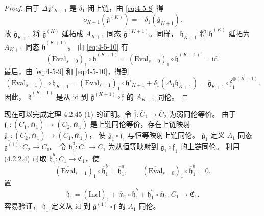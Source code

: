 \begin{proof}
由于 $\Delta\overline{\mathfrak g}'_{K+1}$ 是
$\delta_1$-闭上链，由 \eqref{eq:4-5-8} 得
\[
 o_{K+1}(\overline{\mathfrak g}^{(K)})
 =-\delta_1(\overline{\mathfrak g}_{K+1}).
\]
故 $\overline{\mathfrak g}_{K+1}$ 将
$\overline{\mathfrak g}^{(K)}$ 延拓成
$A_{K+1}$ 同态
$\overline{\mathfrak g}^{(K+1)}$。同样，
$\overline{\mathfrak h}_{K+1}$ 将
$\overline{\mathfrak h}^{(K)}$ 延拓为
$A_{K+1}$ 同态
$\overline{\mathfrak h}^{(K+1)}$。
由 \eqref{eq:4-5-10} 有
\[
 (\overline{\mathrm{Eval}}_{s=0})_1
 \circ\overline{\mathfrak h}^{(K+1)}
 =(\overline{\mathrm{Eval}}_{s=0})_1
 \circ\overline{\mathfrak h}^{(K+1)\prime}
 =\mathrm{id}.
\]
最后，由 \eqref{eq:4-5-9} 和
\eqref{eq:4-5-10}，得到
\[
 (\overline{\mathrm{Eval}}_{s=1})_1
 \circ\overline{\mathfrak h}_{K+1}
 =(\overline{\mathrm{Eval}}_{s=1})_1
  \circ\overline{\mathfrak h}'_{K+1}
  +\delta_1(\Delta_1\overline{\mathfrak h}_{K+1})
 =\overline{\mathfrak g}_{K+1}
  \circ\overline{\mathfrak f}_1^{\otimes(K+1)}.
\]
因此，
$\overline{\mathfrak h}^{(K+1)}$
是从 $\mathrm{id}$ 到
$\overline{\mathfrak g}^{(K+1)}
\circ\overline{\mathfrak f}$ 的
$A_{K+1}$ 同伦。
\end{proof}

现在可以完成定理 4.2.45 (1) 的证明。令
$\overline{\mathfrak f}\colon\overline C_1
\to\overline C_2$ 为弱同伦等价。
由于
$\overline{\mathfrak f}_1\colon
(\overline C_1,\overline{\mathfrak m}_1)
\to(\overline C_2,\overline{\mathfrak m}_1)$
是上链同伦等价，存在上链映射
$\overline{\mathfrak g}_1\colon
(\overline C_2,\overline{\mathfrak m}_1)
\to(\overline C_1,\overline{\mathfrak m}_1)$，
使
$\overline{\mathfrak g}_1
\circ\overline{\mathfrak f}_1$
与恒等映射上链同伦。
$\overline{\mathfrak g}_1$
定义 $A_1$ 同态
$\overline{\mathfrak g}^{(1)}\colon
\overline C_2\to\overline C_1$。
令 $\overline{\mathfrak h}^{a}_1\colon
\overline C_1\to\overline C_1$
为从恒等映射到
$\overline{\mathfrak g}_1\circ
\overline{\mathfrak f}_1$
的上链同伦。
利用 (4.2.2.4) 可取
$\overline{\mathfrak h}^{b}_1\colon
\overline C_1\to\overline{\mathfrak C}_1$，使
\[
 (\overline{\mathrm{Eval}}_{s=1})_1
  \circ\overline{\mathfrak h}^{b}_1
  =\overline{\mathfrak h}^{a}_1,
 \qquad
 (\overline{\mathrm{Eval}}_{s=0})_1
  \circ\overline{\mathfrak h}^{b}_1=0.
\]
置
\[
 \overline{\mathfrak h}_1
 =(\overline{\mathrm{Incl}})_1
  +\overline{\mathfrak m}_1\circ
   \overline{\mathfrak h}^{b}_1
  +\overline{\mathfrak h}^{b}_1\circ
   \overline{\mathfrak m}_1
 \colon\overline C_1\to\overline{\mathfrak C}_1.
\]
容易验证，
$\overline{\mathfrak h}_1$
定义从 $\mathrm{id}$ 到
$\overline{\mathfrak g}^{(1)}
\circ\overline{\mathfrak f}$ 的 $A_1$ 同伦。

